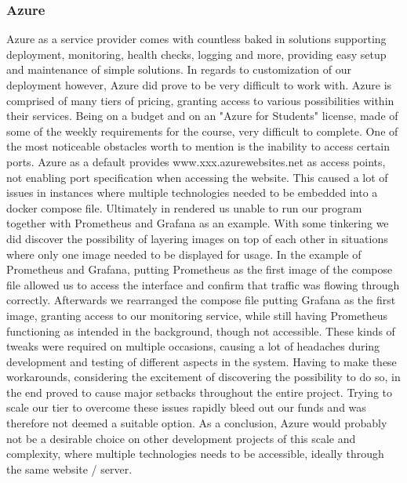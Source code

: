 \documentclass{article}
\begin{document}
    \subsubsection{Azure}
    Azure as a service provider comes with countless baked in solutions supporting deployment, monitoring, health checks, logging and more, providing easy setup and maintenance of simple solutions. In regards to customization of our deployment however, Azure did prove to be very difficult to work with. Azure is comprised of many tiers of pricing, granting access to various possibilities within their services. Being on a budget and on an "Azure for Students" license, made of some of the weekly requirements for the course, very difficult to complete.
    One of the most noticeable obstacles worth to mention is the inability to access certain ports.
    Azure as a default provides www.{xxx}.azurewebsites.net as access points, not enabling port specification when accessing the website. This caused a lot of issues in instances where multiple technologies needed to be embedded into a docker compose file. Ultimately in rendered us unable to run our program together with Prometheus and Grafana as an example.
    With some tinkering we did discover the possibility of layering images on top of each other in situations where only one image needed to be displayed for usage. In the example of Prometheus and Grafana, putting Prometheus as the first image of the compose file allowed us to access the interface and confirm that traffic was flowing through correctly. Afterwards we rearranged the compose file putting Grafana as the first image, granting access to our monitoring service, while still having Prometheus functioning as intended in the background, though not accessible.
    These kinds of tweaks were required on multiple occasions, causing a lot of headaches during development and testing of different aspects in the system.
    Having to make these workarounds, considering the excitement of discovering the possibility to do so, in the end proved to cause major setbacks throughout the entire project. Trying to scale our tier to overcome these issues rapidly bleed out our funds and was therefore not deemed a suitable option.
    As a conclusion, Azure would probably not be a desirable choice on other development projects of this scale and complexity, where multiple technologies needs to be accessible, ideally through the same website / server.
    
\end{document}
